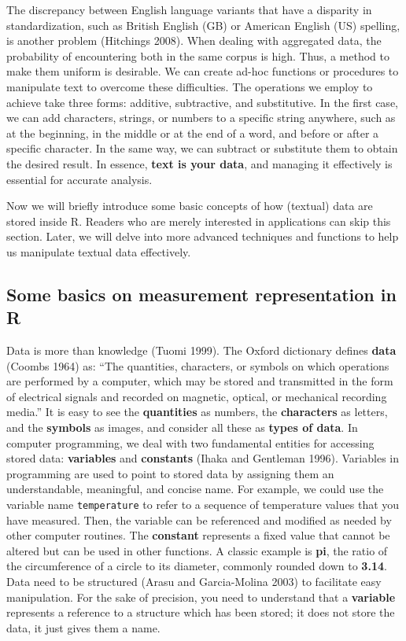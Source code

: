 The discrepancy between English language variants that have a disparity
in standardization, such as British English (GB) or American English
(US) spelling, is another problem (Hitchings 2008). When dealing
with aggregated data, the probability of encountering both in the same
corpus is high. Thus, a method to make them uniform is desirable. We can create
ad-hoc functions or procedures to manipulate text to overcome these
difficulties. The operations we employ to achieve take three forms: additive, subtractive, and substitutive. In the first case,
we can add characters, strings, or numbers to a specific string
anywhere, such as at the beginning, in the middle or at the end of a word, and before or
after a specific character. In the same way, we can subtract or
substitute them to obtain the desired result. In essence,
 \textbf{text is your data}, and managing it effectively is
essential for accurate analysis.

Now we will briefly introduce some basic concepts of how (textual) data are
stored inside R. Readers who are merely interested in applications can
skip this section. Later, we will delve into more advanced techniques
and functions to help us manipulate textual data effectively.

\subsection{Some basics on measurement representation in
R}\label{some-basics-on-measurement-representations-in-r}

Data is more than knowledge (Tuomi 1999). The Oxford dictionary defines
\textbf{data} (Coombs 1964) as: ``The quantities, characters, or symbols
on which operations are performed by a computer, which may be stored and
transmitted in the form of electrical signals and recorded on magnetic,
optical, or mechanical recording media.'' It is easy to see the
\textbf{quantities} as numbers, the \textbf{characters} as letters, and
the \textbf{symbols} as images, and consider all these as \textbf{types of data}. In computer programming, we deal with two fundamental entities for
accessing stored data: \textbf{variables} and \textbf{constants} (Ihaka
and Gentleman 1996). Variables in programming are used to point to
stored data by assigning them an understandable, meaningful, and concise
name. For example, we could use the variable name \texttt{temperature} to refer
to a sequence of temperature values that you have measured. Then, the
variable can be referenced and modified as needed by other computer
routines. The \textbf{constant} represents a fixed value that cannot be
altered but can be used in other functions. A classic example is
\textbf{pi}, the ratio of the circumference of a circle to its diameter,
commonly rounded down to \textbf{3.14}. Data need to be structured
(Arasu and Garcia-Molina 2003) to facilitate easy manipulation. For the
sake of precision, you need to understand that a \textbf{variable}
represents a reference to a structure which has been stored; it does not store the
data, it just gives them a name.

